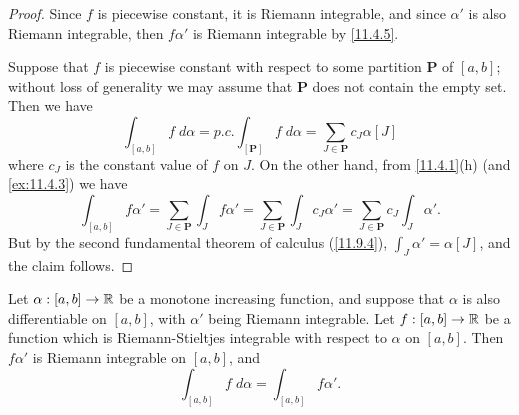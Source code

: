 \begin{proof}
  Since \(f\) is piecewise constant, it is Riemann integrable, and since \(\alpha'\) is also Riemann integrable, then \(f \alpha'\) is Riemann integrable by \cref{11.4.5}.

  Suppose that \(f\) is piecewise constant with respect to some partition \(\mathbf{P}\) of \([a, b]\);
  without loss of generality we may assume that \(\mathbf{P}\) does not contain the empty set.
  Then we have
  \[
    \int_{[a, b]} f \; d \alpha = p.c. \int_{[\mathbf{P}]} f \; d \alpha = \sum_{J \in \mathbf{P}} c_J \alpha[J]
  \]
  where \(c_J\) is the constant value of \(f\) on \(J\).
  On the other hand, from \cref{11.4.1}(h) (and \cref{ex:11.4.3}) we have
  \[
    \int_{[a, b]} f \alpha' = \sum_{J \in \mathbf{P}} \int_J f \alpha' = \sum_{J \in \mathbf{P}} \int_J c_J \alpha' = \sum_{J \in \mathbf{P}} c_J \int_J \alpha'.
  \]
  But by the second fundamental theorem of calculus (\cref{11.9.4}), \(\int_J \alpha' = \alpha[J]\), and the claim follows.
\end{proof}

\begin{cor}\label{11.10.3}
  Let \(\alpha : [a, b] \to \mathbb{R}\) be a monotone increasing function, and suppose that \(\alpha\) is also differentiable on \([a, b]\), with \(\alpha'\) being Riemann integrable.
  Let \(f : [a, b] \to \mathbb{R}\) be a function which is Riemann-Stieltjes integrable with respect to \(\alpha\) on \([a, b]\).
  Then \(f \alpha'\) is Riemann integrable on \([a, b]\), and
  \[
    \int_{[a, b]} f \; d \alpha = \int_{[a, b]} f \alpha'.
  \]
\end{cor}

